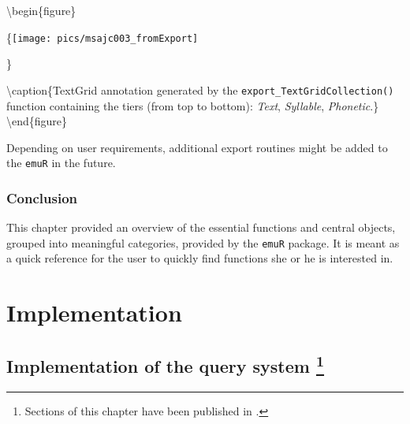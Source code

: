 \documentclass[]{book}
\let\rmarkdownfootnote\footnote%
\def\footnote{\protect\rmarkdownfootnote}
\begin{document}
\textbackslash{}begin\{figure\}

\{\centering \texttt{[image: pics/msajc003\_fromExport]}

\}

\textbackslash{}caption\{TextGrid annotation generated by the \texttt{export\_TextGridCollection()} function containing the tiers (from top to bottom): \emph{Text}, \emph{Syllable}, \emph{Phonetic}.\}\label{fig:emuRfuncs-msajc003-fromExport}
\textbackslash{}end\{figure\}

Depending on user requirements, additional export routines might be added to the \texttt{emuR} in the future.

\hypertarget{conclusion-6}{%
\section{Conclusion}\label{conclusion-6}}

This chapter provided an overview of the essential functions and central objects, grouped into meaningful categories, provided by the \texttt{emuR} package. It is meant as a quick reference for the user to quickly find functions she or he is interested in.

\hypertarget{part-implementation}{%
\part{Implementation}\label{part-implementation}}

\hypertarget{chap:querysys-impl}{%
\chapter[Implementation of the query system ]{\texorpdfstring{Implementation of the query system \footnote{Sections of this chapter have been published in \citet{winkelmann:2017aa}.}}{Implementation of the query system }}\label{chap:querysys-impl}}
\end{document}
